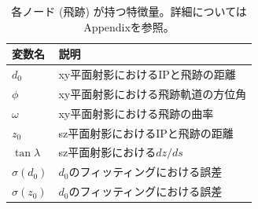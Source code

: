 \begin{table}[H]
\centering
 \begin{tabular}{ l  l }
 \hline
 変数名 & 説明\\
 \hline
 \hline
 $d_0$ & xy平面射影におけるIPと飛跡の距離\\
 $\phi$ & xy平面射影における飛跡軌道の方位角\\
 $\omega$ & xy平面射影における飛跡の曲率\\
 $z_0$ & sz平面射影におけるIPと飛跡の距離\\
 $\tan{\lambda}$ &  sz平面射影における$dz/ds$\\
 $\sigma(d_0)$ & $d_0$のフィッティングにおける誤差\\
 $\sigma(z_0)$ & $d_0$のフィッティングにおける誤差\\
 \hline
 \end{tabular}
 \label{gnnin}
 \caption{各ノード (飛跡) が持つ特徴量。詳細についてはAppendixを参照。}
\end{table}

